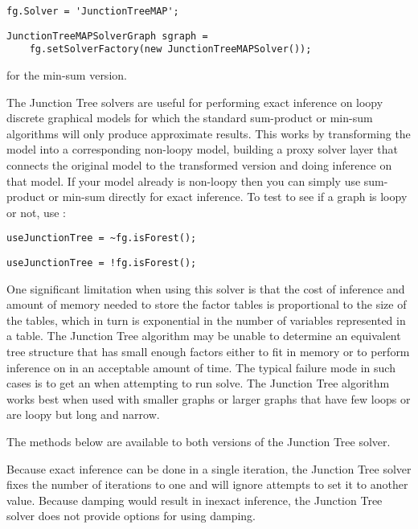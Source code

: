 \ifmatlab
\begin{lstlisting}
fg.Solver = 'JunctionTreeMAP';
\end{lstlisting}
\fi

\ifjava
\begin{lstlisting}
JunctionTreeMAPSolverGraph sgraph =
    fg.setSolverFactory(new JunctionTreeMAPSolver());
\end{lstlisting}
\fi

for the min-sum version.

The Junction Tree solvers are useful for performing exact inference on loopy discrete graphical models for which the standard sum-product or min-sum algorithms will only produce approximate results. This works by transforming the model into a corresponding non-loopy model, building a proxy solver layer that connects the original model to the transformed version and doing inference on that model. If your model already is non-loopy then you can simply use sum-product or min-sum directly for exact inference. To test to see if a graph is loopy or not, use :

\ifmatlab
\begin{lstlisting}
useJunctionTree = ~fg.isForest();
\end{lstlisting}
\fi

\ifjava
\begin{lstlisting}
useJunctionTree = !fg.isForest();
\end{lstlisting}
\fi

One significant limitation when using this solver is that the cost of inference and amount of memory needed to store the factor tables is proportional to the size of the tables, which in turn is exponential in the number of variables represented in a table. The Junction Tree algorithm may be unable to determine an equivalent tree structure that has small enough factors either to fit in memory or to perform inference on in an acceptable amount of time. The typical failure mode in such cases is to get an  when attempting to run solve. The Junction Tree algorithm works best when used with smaller graphs or larger graphs that have few loops or are loopy but long and narrow.


The methods below are available to both versions of the Junction Tree solver.

Because exact inference can be done in a single iteration, the Junction Tree solver fixes the number of iterations to one and will ignore attempts to set it to another value. Because damping would result in inexact inference, the Junction Tree solver does not provide options for using damping.


